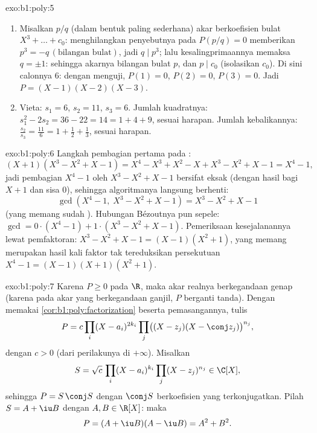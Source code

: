 \begin{solution}{exo:b1:poly:5}
\begin{enumerate}
  \item Misalkan $p/q$ (dalam bentuk paling sederhana) akar  berkoefisien bulat $X^3 + \dots + c_0$: menghilangkan penyebutnya pada
        $P(p/q) = 0$ memberikan $p^3 = -q\,(\text{bilangan bulat})$, jadi $q \mid
        p^3$; lalu kesalingprimaannya memaksa $q = \pm 1$: sehingga akarnya bilangan bulat
        $p$, dan $p \mid c_0$ (isolasikan $c_0$). Di sini calonnya
         $6$: dengan menguji, $P(1) = 0$, $P(2) = 0$, $P(3) = 0$. Jadi
        $P = (X-1)(X-2)(X-3)$.
  \item Vieta: $s_1 = 6$, $s_2 = 11$, $s_3 = 6$. Jumlah kuadratnya:
        $s_1^2 - 2s_2 = 36 - 22 = 14 = 1 + 4 + 9$, sesuai harapan. Jumlah kebalikannya:
        $\frac{s_2}{s_3} = \frac{11}{6} = 1 + \frac12 + \frac13$, sesuai harapan.
\end{enumerate}
\end{solution}

\begin{solution}{exo:b1:poly:6}
Langkah pembagian pertama pada :
\[
(X + 1)(X^3 - X^2 + X - 1)
= X^4 - X^3 + X^2 - X + X^3 - X^2 + X - 1 = X^4 - 1 ,
\]
jadi pembagian $X^4 - 1$ oleh $X^3 - X^2 + X - 1$ bersifat eksak
(dengan hasil bagi $X + 1$ dan sisa $0$), sehingga algoritmanya langsung berhenti:
\[
\gcd(X^4 - 1,\; X^3 - X^2 + X - 1) = X^3 - X^2 + X - 1
\]
(yang memang sudah ). Hubungan Bézoutnya pun sepele: $\gcd = 0
\cdot (X^4 - 1) + 1 \cdot (X^3 - X^2 + X - 1)$. Pemeriksaan kesejalanannya lewat
pemfaktoran: $X^3 - X^2 + X - 1 = (X - 1)(X^2 + 1)$, yang memang
merupakan hasil kali faktor tak tereduksikan persekutuan $X^4 - 1 =
(X-1)(X+1)(X^2+1)$.
\end{solution}

\begin{solution}{exo:b1:poly:7}
Karena $P \geq 0$ pada $\R$, maka akar realnya berkegandaan genap (karena pada
akar yang berkegandaan ganjil, $P$ berganti tanda). Dengan memakai
\cref{cor:b1:poly:factorization} beserta pemasangannya, tulis
\[
P = c \prod_i (X - a_i)^{2k_i} \prod_j \bigl((X - z_j)(X - \conj
z_j)\bigr)^{n_j},
\]
dengan $c > 0$ (dari perilakunya di $+\infty$). Misalkan
\[
S = \sqrt c\, \prod_i (X - a_i)^{k_i} \prod_j (X - z_j)^{n_j}
\in \C[X],
\]
sehingga $P = S\,\conj S$ dengan $\conj S$ berkoefisien yang
terkonjugatkan. Pilah $S = A + \iu B$ dengan $A, B \in \R[X]$: maka
\[
P = (A + \iu B)(A - \iu B) = A^2 + B^2 .
\]
\end{solution}


